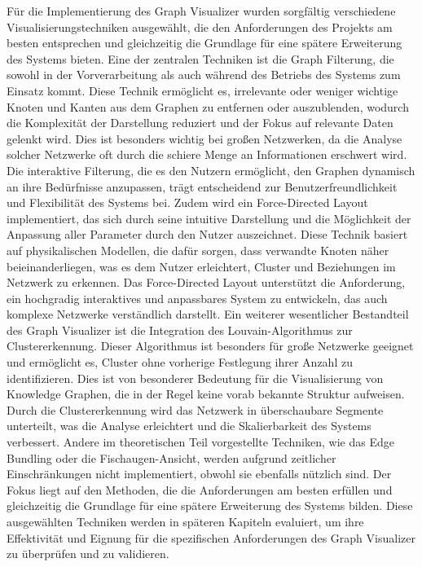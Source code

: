 Für die Implementierung des Graph Visualizer wurden sorgfältig verschiedene Visualisierungstechniken ausgewählt, die den Anforderungen des Projekts am besten entsprechen und gleichzeitig die Grundlage für eine spätere Erweiterung des Systems bieten. Eine der zentralen Techniken ist die Graph Filterung, die sowohl in der Vorverarbeitung als auch während des Betriebs des Systems zum Einsatz kommt. Diese Technik ermöglicht es, irrelevante oder weniger wichtige Knoten und Kanten aus dem Graphen zu entfernen oder auszublenden, wodurch die Komplexität der Darstellung reduziert und der Fokus auf relevante Daten gelenkt wird. Dies ist besonders wichtig bei großen Netzwerken, da die Analyse solcher Netzwerke oft durch die schiere Menge an Informationen erschwert wird. Die interaktive Filterung, die es den Nutzern ermöglicht, den Graphen dynamisch an ihre Bedürfnisse anzupassen, trägt entscheidend zur Benutzerfreundlichkeit und Flexibilität des Systems bei. Zudem wird ein Force-Directed Layout implementiert, das sich durch seine intuitive Darstellung und die Möglichkeit der Anpassung aller Parameter durch den Nutzer auszeichnet. Diese Technik basiert auf physikalischen Modellen, die dafür sorgen, dass verwandte Knoten näher beieinanderliegen, was es dem Nutzer erleichtert, Cluster und Beziehungen im Netzwerk zu erkennen. Das Force-Directed Layout unterstützt die Anforderung, ein hochgradig interaktives und anpassbares System zu entwickeln, das auch komplexe Netzwerke verständlich darstellt. Ein weiterer wesentlicher Bestandteil des Graph Visualizer ist die Integration des Louvain-Algorithmus zur Clustererkennung. Dieser Algorithmus ist besonders für große Netzwerke geeignet und ermöglicht es, Cluster ohne vorherige Festlegung ihrer Anzahl zu identifizieren. Dies ist von besonderer Bedeutung für die Visualisierung von Knowledge Graphen, die in der Regel keine vorab bekannte Struktur aufweisen. Durch die Clustererkennung wird das Netzwerk in überschaubare Segmente unterteilt, was die Analyse erleichtert und die Skalierbarkeit des Systems verbessert. Andere im theoretischen Teil vorgestellte Techniken, wie das Edge Bundling oder die Fischaugen-Ansicht, werden aufgrund zeitlicher Einschränkungen nicht implementiert, obwohl sie ebenfalls nützlich sind. Der Fokus liegt auf den Methoden, die die Anforderungen am besten erfüllen und gleichzeitig die Grundlage für eine spätere Erweiterung des Systems bilden. Diese ausgewählten Techniken werden in späteren Kapiteln evaluiert, um ihre Effektivität und Eignung für die spezifischen Anforderungen des Graph Visualizer zu überprüfen und zu validieren.

